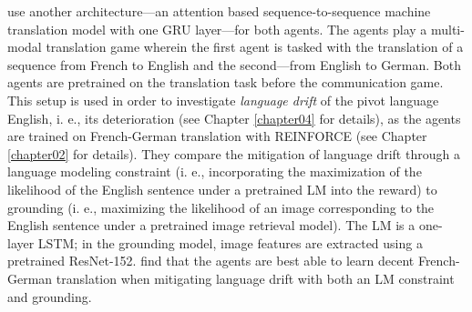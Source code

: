
\cite{lee2019countering} use another architecture---an attention based sequence-to-sequence machine translation model with one GRU layer---for both agents. 
The agents play a multi-modal translation game wherein the first agent is tasked with the translation of a sequence from French to English and the second---from English to German. Both agents are pretrained on the translation task before the communication game. This setup is used in order to investigate \textit{language drift} of the pivot language English, i. e., its deterioration (see Chapter \ref{chapter04} for details), as the agents are trained on French-German translation with REINFORCE (see Chapter \ref{chapter02} for details). They compare the mitigation of language drift through a language modeling constraint (i. e., incorporating the maximization of the likelihood of the English sentence under a pretrained LM into the reward) to grounding (i. e., maximizing the likelihood of an image corresponding to the English sentence under a pretrained image retrieval model). The LM is a one-layer LSTM; in the grounding model, image features are extracted using a pretrained ResNet-152. \cite{lee2019countering} find that the agents are best able to learn decent French-German translation when mitigating language drift with both an LM constraint and grounding. 

